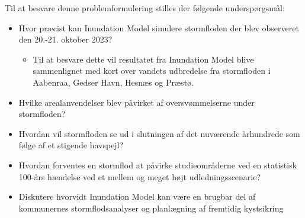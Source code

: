 Til at besvare denne problemformulering stilles der følgende underspørgsmål:
\begin{itemize}
    \setlength{\itemsep}{0pt}
    \setlength{\parskip}{0pt}
    \setlength{\parsep}{0pt}
    \item Hvor præcist kan Inundation Model simulere stormfloden der blev observeret den 20.-21. oktober 2023?
    \begin{itemize}
        \item Til at besvare dette vil resultatet fra Inundation Model blive sammenlignet med kort over vandets udbredelse fra stormfloden i Aabenraa, Gedser Havn, Hesnæs og Præstø.
    \end{itemize}
    \item Hvilke arealanvendelser blev påvirket af oversvømmelserne under stormfloden?
    \item Hvordan vil stormfloden se ud i slutningen af det nuværende århundrede som følge af et stigende havspejl?
    \item Hvordan forventes en stormflod at påvirke studieområderne ved en statistisk 100-års hændelse ved et mellem og meget højt udledningsscenarie?
    \item Diskutere hvorvidt Inundation Model kan være en brugbar del af kommunernes stormflodsanalyser og planlægning af fremtidig kystsikring
\end{itemize}